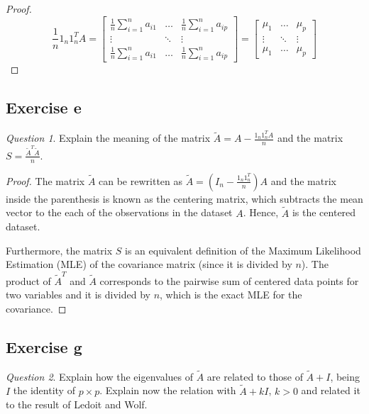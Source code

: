\documentclass[11pt]{article}
\theoremstyle{definition}
\theoremstyle{remark}
\theoremstyle{remark}
\theoremstyle{remark}
\newtheorem*{question}{Question}
\theoremstyle{proof}
\begin{document}
\begin{proof}
  \begin{equation*}
    \frac{1}{n}1_{n}1_{n}^{T}A =
      \begin{bmatrix}
        \displaystyle\frac{1}{n}\sum_{i=1}^{n}a_{i1} & \ldots & \displaystyle\frac{1}{n}\sum_{i=1}^{n}a_{ip} \\
        \vdots & \ddots & \vdots \\
        \displaystyle\frac{1}{n}\sum_{i=1}^{n}a_{i1} & \ldots & \displaystyle\frac{1}{n}\sum_{i=1}^{n}a_{ip}
      \end{bmatrix}
      =
      \begin{bmatrix}
        \mu_{1} & \ldots & \mu_{p} \\
        \vdots & \ddots & \vdots \\
        \mu_{1} & \ldots & \mu_{p}
      \end{bmatrix}
  \end{equation*}
\end{proof}

\subsection*{Exercise e}
\begin{question}
  Explain the meaning of the matrix $\tilde{A}=A-\frac{1_n1_n^TA}{n}$ and the
  matrix $S=\frac{\tilde{A}^T\tilde{A}}{n}$.
\end{question}
\begin{proof}
  The matrix $\tilde{A}$ can be rewritten as
  $\tilde{A}=\left(I_n-\frac{1_n1_n^T}{n}\right)A$ and the matrix inside the
  parenthesis is known as the centering matrix, which subtracts the mean vector
  to the each of the observations in the dataset $A$. Hence, $\tilde{A}$ is the
  centered dataset.

  Furthermore, the matrix $S$ is an equivalent definition of the Maximum
  Likelihood Estimation (MLE) of the covariance matrix (since it is divided by
  $n$). The product of $\tilde{A}^T$ and $\tilde{A}$ corresponds to the pairwise
  sum of centered data points for two variables and it is divided by $n$, which
  is the exact MLE for the covariance.
\end{proof}

\subsection*{Exercise g}
\begin{question}
  Explain how the eigenvalues of $\widetilde{A}$ are related to those of
  $\widetilde{A} + I$, being $I$ the identity of $p \times p$. Explain now the
  relation with $\widetilde{A} +kI$, $k >0$ and related it to the result of
  Ledoit and Wolf.
\end{question}
\end{document}
